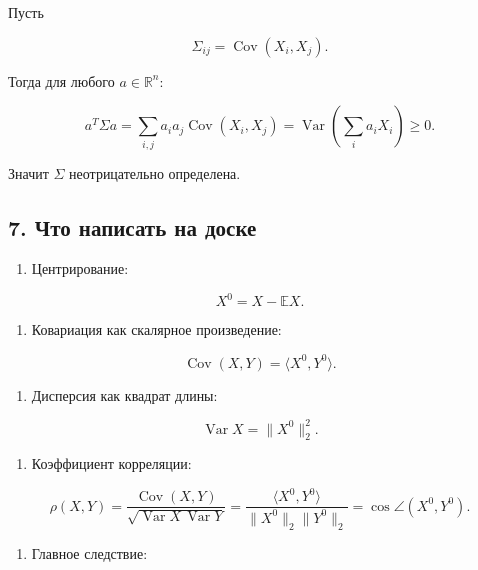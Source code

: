 \documentclass[
  11pt,
  a4paper,
]{article}
\providecommand{\tightlist}{%
  \setlength{\itemsep}{0pt}\setlength{\parskip}{0pt}}
\begin{document}
Пусть

\[
\Sigma_{ij}=\operatorname{Cov}(X_i,X_j).
\]

Тогда для любого \(a\in\mathbb R^n\):

\[
a^T\Sigma a
=
\sum_{i,j}a_i a_j\operatorname{Cov}(X_i,X_j)
=
\operatorname{Var}\left(\sum_i a_iX_i\right)
\ge0.
\]

Значит \(\Sigma\) неотрицательно определена.

\subsection{7. Что написать на
доске}\label{ux447ux442ux43e-ux43dux430ux43fux438ux441ux430ux442ux44c-ux43dux430-ux434ux43eux441ux43aux435}

\begin{enumerate}
\def\labelenumi{\arabic{enumi}.}
\tightlist
\item
  Центрирование:
\end{enumerate}

\[
X^0=X-\mathbb EX.
\]

\begin{enumerate}
\def\labelenumi{\arabic{enumi}.}
\setcounter{enumi}{1}
\tightlist
\item
  Ковариация как скалярное произведение:
\end{enumerate}

\[
\operatorname{Cov}(X,Y)=\langle X^0,Y^0\rangle.
\]

\begin{enumerate}
\def\labelenumi{\arabic{enumi}.}
\setcounter{enumi}{2}
\tightlist
\item
  Дисперсия как квадрат длины:
\end{enumerate}

\[
\operatorname{Var}X=\|X^0\|_2^2.
\]

\begin{enumerate}
\def\labelenumi{\arabic{enumi}.}
\setcounter{enumi}{3}
\tightlist
\item
  Коэффициент корреляции:
\end{enumerate}

\[
\rho(X,Y)
=
\frac{\operatorname{Cov}(X,Y)}
{\sqrt{\operatorname{Var}X\,\operatorname{Var}Y}}
=
\frac{\langle X^0,Y^0\rangle}{\|X^0\|_2\|Y^0\|_2}
=
\cos\angle(X^0,Y^0).
\]

\begin{enumerate}
\def\labelenumi{\arabic{enumi}.}
\setcounter{enumi}{4}
\tightlist
\item
  Главное следствие:
\end{enumerate}
\end{document}
